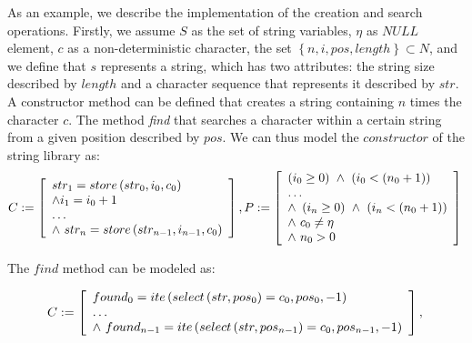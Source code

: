 \documentclass[a4paper]{llncs}
\begin{document}
As an example, we describe the implementation of the creation and search
operations. Firstly, we assume $S$ as the set of string variables,
$\eta$ as $NULL$ element, $c$ as a non-deterministic character,
the set $\left\{n, i, pos, length\right\} \subset N$,
and we define that $s$ represents a string, which has two attributes:
the string size described by $length$ and a character sequence that
represents it described by $str$. A constructor method can be defined
that creates a string containing $n$ times the character $c$. The method
\textit{find} that searches a character within a certain string from a
given position described by $pos$. We can thus model the $constructor$
of the string library as:
%
\begin{equation}
\label{constructor-string}
C := \left [ \begin{array}{ll}
                str_{1} = store\left(str_{0}, i_{0}, c_{0}\right) \\
		\wedge i_{1} = i_{0} + 1  \\
		\ldots \\
		\wedge \, \, str_{n} = store\left(str_{n-1}, i_{n-1}, c_{0}\right)
              \end{array} \right ],  \\
P := \left [ \begin{array}{ll}
                \left(i_{0} \geq 0\right)  \, \, \wedge \, \, \left(i_{0} < \left(n_{0} + 1\right)\right)\\
                \ldots \\
                \wedge \, \, \left(i_{n} \geq 0\right)  \, \, \wedge \, \, \left(i_{n} < \left(n_{0} + 1\right)\right)\\
                \wedge \, \, c_{0} \neq \eta\\
                \wedge \, \, n_{0} > 0\\
              \end{array} \right ]  \\
\end{equation}

The $find$ method can be modeled as:

\begin{equation}
\label{cfind-string}
C := \left [ \begin{array}{ll}
              found_{0} = ite\left(select\left(str, pos_{0}\right) = c_{0}, pos_{0}, -1\right)\\
              \ldots \\
               \wedge \, \, found_{n-1} = ite\left(select\left(str, pos_{n-1}\right) = c_{0}, pos_{n-1}, -1\right)\\
              \end{array} \right ],  \\
\nonumber
\end{equation}
\end{document}
